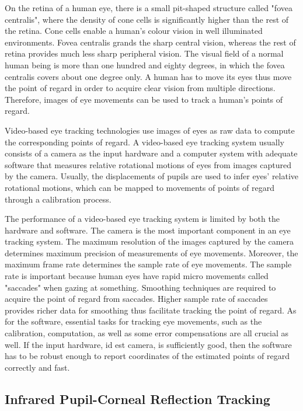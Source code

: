 \documentclass[english]{tktltiki}
\begin{document}
On the retina of a human eye, there is a small pit-shaped structure called "fovea centralis", where the density of cone cells is significantly higher than the rest of the retina. Cone cells enable a human's colour vision in well illuminated environments. Fovea centralis grands the sharp central vision, whereas the rest of retina provides much less sharp peripheral vision. The visual field of a normal human being is more than one hundred and eighty degrees, in which the fovea centralis covers about one degree only. A human has to move its eyes thus move the point of regard in order to acquire clear vision from multiple directions. Therefore, images of eye movements can be used to track a human's points of regard.

Video-based eye tracking technologies use images of eyes as raw data to compute the corresponding points of regard. A video-based eye tracking system usually consists of a camera as the input hardware and a computer system with adequate software that measures relative rotational motions of eyes from images captured by the camera. Usually, the displacements of pupils are used to infer eyes' relative rotational motions, which can be mapped to movements of points of regard through a calibration process. 

The performance of a video-based eye tracking system is limited by both the hardware and software. The camera is the most important component in an eye tracking system. The maximum resolution of the images captured by the camera determines maximum precision of measurements of eye movements. Moreover, the maximum frame rate determines the sample rate of eye movements. The sample rate is important because human eyes have rapid micro movements called "saccades" when gazing at something. Smoothing techniques are required to acquire the point of regard from saccades. Higher sample rate of saccades provides richer data for smoothing thus facilitate tracking the point of regard. As for the software, essential tasks for tracking eye movements, such as the calibration, computation, as well as some error compensations are all crucial as well. If the input hardware, id est camera, is sufficiently good, then the software has to be robust enough to report coordinates of the estimated points of regard correctly and fast.


\subsection{Infrared Pupil-Corneal Reflection Tracking}
\end{document}
